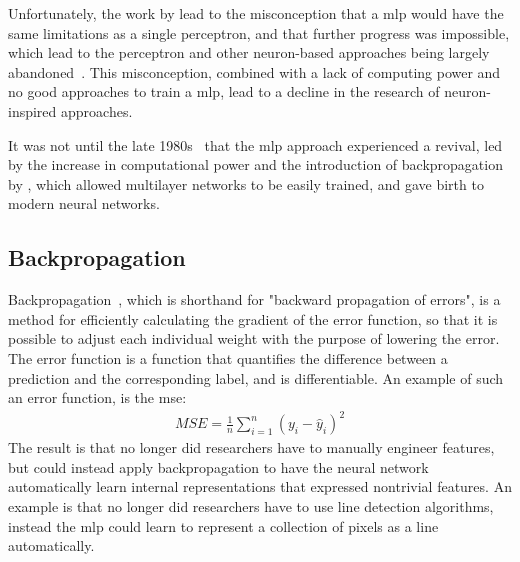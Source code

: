 \par
Unfortunately, the work by \textcite{perceptron3} lead to the misconception that a \gls*{mlp} would have the same limitations as a single perceptron, and that further progress was impossible, which lead to the perceptron and other neuron-based approaches being largely abandoned~\cite{perceptron_misconceptions}. This misconception, combined with a lack of computing power and no good approaches to train a \gls*{mlp}, lead to a decline in the research of neuron-inspired approaches.
\par
It was not until the late 1980s~\cite{perceptron_misconceptions} that the \gls*{mlp} approach experienced a revival, led by the increase in computational power and the introduction of backpropagation by \textcite{backprop}, which allowed multilayer networks to be easily trained, and gave birth to modern neural networks.
\subsection{Backpropagation}
Backpropagation~\cite{backprop}, which is shorthand for "backward propagation of errors",  is a method for efficiently calculating the gradient of the error function, so that it is possible to adjust each individual weight with the purpose of lowering the error. The error function is a function that quantifies the difference between a prediction and the corresponding label, and is differentiable. An example of such an error function, is the \gls*{mse}:
\begin{align*}
    MSE=\frac{1}{n}\sum_{i=1}^n (y_i-\hat{y}_i)^2
\end{align*}
The result is that no longer did researchers have to manually engineer features, but could instead apply backpropagation to have the neural network automatically learn internal representations that expressed nontrivial features. An example is that no longer did researchers have to use line detection algorithms, instead the \gls*{mlp} could learn to represent a collection of pixels as a line automatically.
